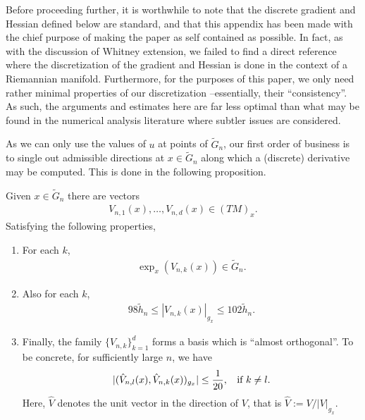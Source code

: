 \documentclass[11pt,reqno]{amsart}
\numberwithin{equation}{section}
\theoremstyle{plain}
\begin{document}
\begin{rem} Before proceeding further, it is worthwhile to note that the discrete gradient and Hessian defined below are standard, and that this appendix has been made with the chief purpose of making the paper as self contained as possible. In fact, as with the discussion of Whitney extension, we failed to find a direct reference where the discretization of the gradient and Hessian is done in the context of a Riemannian manifold. Furthermore, for the purposes of this paper, we only need rather minimal properties of our discretization --essentially, their ``consistency''. As such, the arguments and estimates here are far less optimal than what may be found in the numerical analysis literature where subtler issues are considered.\end{rem}


As we can only use the values of $u$ at points of $\tilde G_n$, our first order of business is to single out admissible directions at $x\in \tilde G_n$ along which a (discrete) derivative may be computed. This is done in the following proposition.

\begin{prop}\label{prop:Appendix Admissible Directions}
  Given $x \in \tilde G_n$  	there are vectors
  \begin{align*} 
    V_{n,1}(x),\ldots,V_{n,d}(x) \in (TM)_x. 
  \end{align*}
  Satisfying the following properties,
  \begin{enumerate}
    \item For each $k$,
    \begin{align*}
      \exp_{x}(V_{n,k}(x)) \in \tilde G_n.		
    \end{align*}		
    \item Also for each $k$,
    \begin{align*}
       98 \tilde h_n \leq |V_{n,k}(x)|_{g_x} \leq 102 \tilde h_n.
    \end{align*}	
			  
    \item Finally, the family $\{V_{n,k}\}_{k=1}^{d}$ forms a basis which is ``almost orthogonal''. To be concrete, for sufficiently large $n$, we have
    \begin{align*}
      |(\hat V_{n,l}(x),\hat V_{n,k}(x))_{g_x}|\leq \frac{1}{20},\;\;\textnormal{ if } k\neq l.
    \end{align*}
    Here, $\hat V$ denotes the unit vector in the direction of $V$, that is $\hat V:= V/|V|_{g_x}$. 	
		
  \end{enumerate}
\end{prop}
\end{document}

